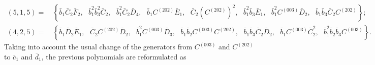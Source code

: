 \documentclass[10pt]{amsart}
\theoremstyle{definition}
\theoremstyle{corollary}
\theoremstyle{remark}
\theoremstyle{conclusion}
\begin{document}
\begin{align*}
     (5,1,5)= &\, \left\{ \bar{b}_1 \bar{C}_2 \bar{F}_2, \text{ }  \bar{b}_1^2 \bar{b}_3^2 \bar{C}_2, \text{ } \bar{b}_1^2 \bar{C}_2 \bar{D}_4, \text{ } \bar{b}_1 C^{(202)} \bar{E}_1, \text{ } \bar{C}_2 \left(C^{(202)}\right)^2, \text{ } \bar{b}_1^2 \bar{b}_3 \bar{E}_1, \text{ } \bar{b}_1^2 C^{(003)} \bar{D}_2, \text{ } \bar{b}_1 \bar{b}_3 \bar{C}_2 C^{(202)}\right\} ;\\
     (4,2,5) = &\, \left\{\bar{b}_1 \bar{D}_2 \bar{E}_1, \text{ } \bar{C}_2 C^{(202)} \bar{D}_2, \text{ } \bar{b}_1^2 C^{(003)} \bar{D}_3, \text{ } \bar{b}_1 \bar{b}_2 C^{(003)} C^{(202)}, \text{ } \bar{b}_1 \bar{b}_3 \bar{C}_2 \bar{D}_2, \text{ } \bar{b}_1 C^{(003)} \bar{C}_2^2, \text{ } \bar{b}_1^2 \bar{b}_2 \bar{b}_3 C^{(003)} \right\} .
 \end{align*} 
 Taking into account the usual change of the generators from $C^{(003)}$ and $C^{(202)}$ to $\bar{c}_1$ and $\bar{d}_1$,  the previous polynomials are reformulated as 
\end{document}
